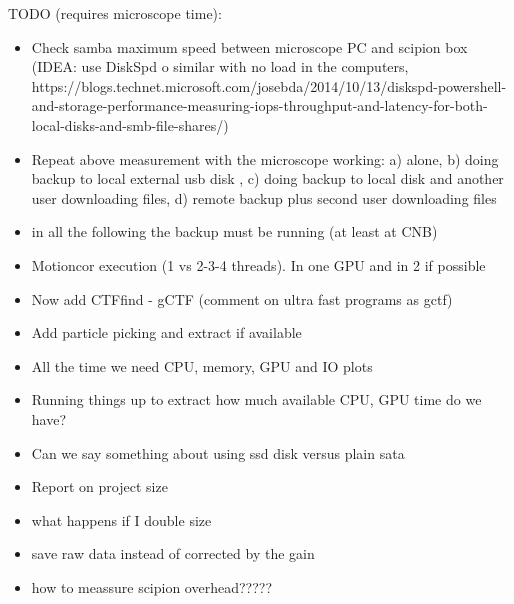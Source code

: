 \noindent
TODO (requires microscope time):
\begin{itemize}
   \item Check samba maximum speed between microscope PC and scipion box (IDEA: use DiskSpd o similar with no load in the computers, https://blogs.technet.microsoft.com/josebda/2014/10/13/diskspd-powershell-and-storage-performance-measuring-iops-throughput-and-latency-for-both-local-disks-and-smb-file-shares/)
   
   \item Repeat above measurement with the  microscope working: a) alone, b) doing backup to local external usb disk , c) doing backup to local disk and another user downloading files, d) remote backup plus second user downloading files
   
   \item in all the following the backup must be running (at least at CNB)
   
   \item Motioncor execution (1 vs 2-3-4 threads). In one GPU and in 2 if possible
   
   \item Now add CTFfind - gCTF (comment on ultra fast programs as gctf)
   
   \item Add particle picking and extract if available
   
   \item All the time we need CPU, memory, GPU and IO plots
      
   \item Running things up to extract  how much available CPU, GPU time do we have?
   
   \item Can we say something about using ssd disk versus plain sata
   
   \item Report on project size
   
   \item what happens if I double size
   
   \item save raw data instead of corrected by the gain
   
   \item how to meassure scipion overhead?????
   
\end{itemize}
   

